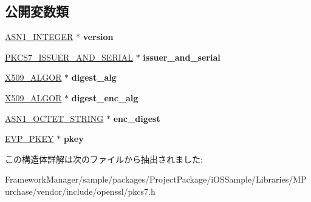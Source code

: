 \subsection*{公開変数類}
\begin{DoxyCompactItemize}
\item 
\hypertarget{structpkcs7__signer__info__st_ab6bd5b6bebe8adab9a294916c929bdc0}{}\hyperlink{structasn1__string__st}{A\+S\+N1\+\_\+\+I\+N\+T\+E\+G\+E\+R} $\ast$ {\bfseries version}\label{structpkcs7__signer__info__st_ab6bd5b6bebe8adab9a294916c929bdc0}

\item 
\hypertarget{structpkcs7__signer__info__st_aa50f5aaf37775fa181c551407b620d6c}{}\hyperlink{structpkcs7__issuer__and__serial__st}{P\+K\+C\+S7\+\_\+\+I\+S\+S\+U\+E\+R\+\_\+\+A\+N\+D\+\_\+\+S\+E\+R\+I\+A\+L} $\ast$ {\bfseries issuer\+\_\+and\+\_\+serial}\label{structpkcs7__signer__info__st_aa50f5aaf37775fa181c551407b620d6c}

\item 
\hypertarget{structpkcs7__signer__info__st_a238fa797ab7db21717ae5b4d68a925ef}{}\hyperlink{struct_x509__algor__st}{X509\+\_\+\+A\+L\+G\+O\+R} $\ast$ {\bfseries digest\+\_\+alg}\label{structpkcs7__signer__info__st_a238fa797ab7db21717ae5b4d68a925ef}

\item 
\hypertarget{structpkcs7__signer__info__st_afe09a7f44afddb51e073c912cb5b7c7c}{}\hyperlink{struct_x509__algor__st}{X509\+\_\+\+A\+L\+G\+O\+R} $\ast$ {\bfseries digest\+\_\+enc\+\_\+alg}\label{structpkcs7__signer__info__st_afe09a7f44afddb51e073c912cb5b7c7c}

\item 
\hypertarget{structpkcs7__signer__info__st_a75a871ba0bdc83cbd05822e844badf40}{}\hyperlink{structasn1__string__st}{A\+S\+N1\+\_\+\+O\+C\+T\+E\+T\+\_\+\+S\+T\+R\+I\+N\+G} $\ast$ {\bfseries enc\+\_\+digest}\label{structpkcs7__signer__info__st_a75a871ba0bdc83cbd05822e844badf40}

\item 
\hypertarget{structpkcs7__signer__info__st_acac9c5af6fa0f01bb42fe39c8f2f646a}{}\hyperlink{structevp__pkey__st}{E\+V\+P\+\_\+\+P\+K\+E\+Y} $\ast$ {\bfseries pkey}\label{structpkcs7__signer__info__st_acac9c5af6fa0f01bb42fe39c8f2f646a}

\end{DoxyCompactItemize}


この構造体詳解は次のファイルから抽出されました\+:\begin{DoxyCompactItemize}
\item 
Framework\+Manager/sample/packages/\+Project\+Package/i\+O\+S\+Sample/\+Libraries/\+M\+Purchase/vendor/include/openssl/pkcs7.\+h\end{DoxyCompactItemize}
